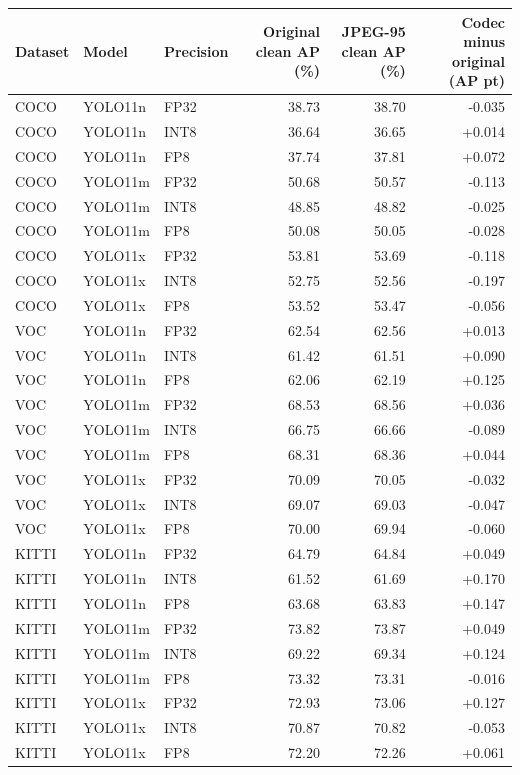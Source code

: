 \begin{tabular}{lllrrr}
\toprule
Dataset & Model & Precision & Original clean AP (\%) & JPEG-95 clean AP (\%) & Codec minus original (AP pt) \\
\midrule
COCO & YOLO11n & FP32 & 38.73 & 38.70 & -0.035 \\
COCO & YOLO11n & INT8 & 36.64 & 36.65 & +0.014 \\
COCO & YOLO11n & FP8 & 37.74 & 37.81 & +0.072 \\
COCO & YOLO11m & FP32 & 50.68 & 50.57 & -0.113 \\
COCO & YOLO11m & INT8 & 48.85 & 48.82 & -0.025 \\
COCO & YOLO11m & FP8 & 50.08 & 50.05 & -0.028 \\
COCO & YOLO11x & FP32 & 53.81 & 53.69 & -0.118 \\
COCO & YOLO11x & INT8 & 52.75 & 52.56 & -0.197 \\
COCO & YOLO11x & FP8 & 53.52 & 53.47 & -0.056 \\
VOC & YOLO11n & FP32 & 62.54 & 62.56 & +0.013 \\
VOC & YOLO11n & INT8 & 61.42 & 61.51 & +0.090 \\
VOC & YOLO11n & FP8 & 62.06 & 62.19 & +0.125 \\
VOC & YOLO11m & FP32 & 68.53 & 68.56 & +0.036 \\
VOC & YOLO11m & INT8 & 66.75 & 66.66 & -0.089 \\
VOC & YOLO11m & FP8 & 68.31 & 68.36 & +0.044 \\
VOC & YOLO11x & FP32 & 70.09 & 70.05 & -0.032 \\
VOC & YOLO11x & INT8 & 69.07 & 69.03 & -0.047 \\
VOC & YOLO11x & FP8 & 70.00 & 69.94 & -0.060 \\
KITTI & YOLO11n & FP32 & 64.79 & 64.84 & +0.049 \\
KITTI & YOLO11n & INT8 & 61.52 & 61.69 & +0.170 \\
KITTI & YOLO11n & FP8 & 63.68 & 63.83 & +0.147 \\
KITTI & YOLO11m & FP32 & 73.82 & 73.87 & +0.049 \\
KITTI & YOLO11m & INT8 & 69.22 & 69.34 & +0.124 \\
KITTI & YOLO11m & FP8 & 73.32 & 73.31 & -0.016 \\
KITTI & YOLO11x & FP32 & 72.93 & 73.06 & +0.127 \\
KITTI & YOLO11x & INT8 & 70.87 & 70.82 & -0.053 \\
KITTI & YOLO11x & FP8 & 72.20 & 72.26 & +0.061 \\

\end{tabular}

